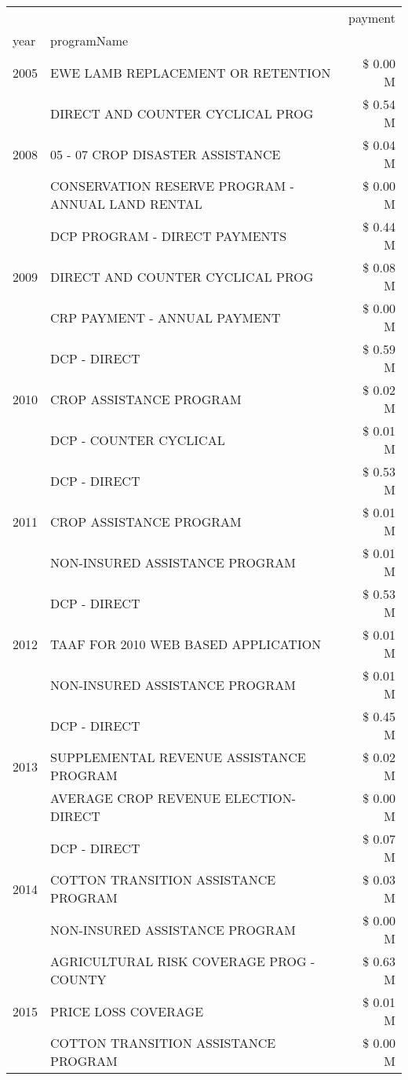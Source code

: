 \begin{tabular}{llr}
\toprule
 &  & payment \\
year & programName &  \\
\midrule
2005 & EWE LAMB REPLACEMENT OR RETENTION & \$ 0.00 M \\
\cline{1-3}
\multirow[t]{3}{*}{2008} & DIRECT AND COUNTER CYCLICAL PROG & \$ 0.54 M \\
 & 05 - 07 CROP DISASTER ASSISTANCE & \$ 0.04 M \\
 & CONSERVATION RESERVE PROGRAM - ANNUAL LAND RENTAL & \$ 0.00 M \\
\cline{1-3}
\multirow[t]{3}{*}{2009} & DCP PROGRAM - DIRECT PAYMENTS & \$ 0.44 M \\
 & DIRECT AND COUNTER CYCLICAL PROG & \$ 0.08 M \\
 & CRP PAYMENT - ANNUAL PAYMENT & \$ 0.00 M \\
\cline{1-3}
\multirow[t]{3}{*}{2010} & DCP - DIRECT & \$ 0.59 M \\
 & CROP ASSISTANCE PROGRAM & \$ 0.02 M \\
 & DCP - COUNTER CYCLICAL & \$ 0.01 M \\
\cline{1-3}
\multirow[t]{3}{*}{2011} & DCP - DIRECT & \$ 0.53 M \\
 & CROP ASSISTANCE PROGRAM & \$ 0.01 M \\
 & NON-INSURED ASSISTANCE PROGRAM & \$ 0.01 M \\
\cline{1-3}
\multirow[t]{3}{*}{2012} & DCP - DIRECT & \$ 0.53 M \\
 & TAAF FOR 2010 WEB BASED APPLICATION & \$ 0.01 M \\
 & NON-INSURED ASSISTANCE PROGRAM & \$ 0.01 M \\
\cline{1-3}
\multirow[t]{3}{*}{2013} & DCP - DIRECT & \$ 0.45 M \\
 & SUPPLEMENTAL REVENUE ASSISTANCE PROGRAM & \$ 0.02 M \\
 & AVERAGE CROP REVENUE ELECTION-DIRECT & \$ 0.00 M \\
\cline{1-3}
\multirow[t]{3}{*}{2014} & DCP - DIRECT & \$ 0.07 M \\
 & COTTON TRANSITION ASSISTANCE PROGRAM & \$ 0.03 M \\
 & NON-INSURED ASSISTANCE PROGRAM & \$ 0.00 M \\
\cline{1-3}
\multirow[t]{3}{*}{2015} & AGRICULTURAL RISK COVERAGE PROG - COUNTY & \$ 0.63 M \\
 & PRICE LOSS COVERAGE & \$ 0.01 M \\
 & COTTON TRANSITION ASSISTANCE PROGRAM & \$ 0.00 M \\

\end{tabular}
